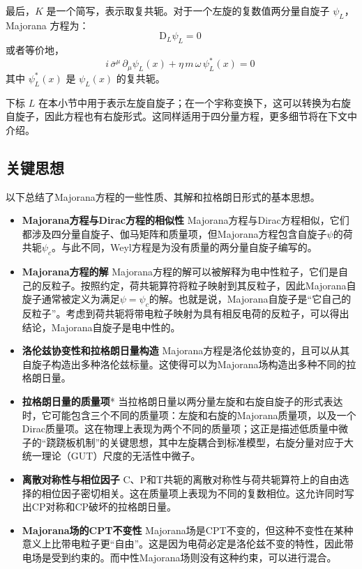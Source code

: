 最后，\( K \) 是一个简写，表示取复共轭。对于一个左旋的复数值两分量自旋子 \( \psi_L \)，Majorana 方程为：
\[
\mathrm{D}_{L} \psi_L = 0~
\]
或者等价地，
\[
i \, \overline{\sigma}^{\mu} \, \partial_{\mu} \psi_L(x) + \eta \, m \, \omega \, \psi_L^*(x) = 0~
\]
其中 \( \psi_L^*(x) \) 是 \( \psi_L(x) \) 的复共轭。  

下标 \(L\) 在本小节中用于表示左旋自旋子；在一个宇称变换下，这可以转换为右旋自旋子，因此方程也有右旋形式。这同样适用于四分量方程，更多细节将在下文中介绍。
\subsection{关键思想}

以下总结了Majorana方程的一些性质、其解和拉格朗日形式的基本思想。

\begin{itemize}
\item \textbf{Majorana方程与Dirac方程的相似性}  
   Majorana方程与Dirac方程相似，它们都涉及四分量自旋子、伽马矩阵和质量项，但Majorana方程包含自旋子\(\psi\)的荷共轭\(\psi_c\)。与此不同，Weyl方程是为没有质量的两分量自旋子编写的。
\item \textbf{Majorana方程的解}  
   Majorana方程的解可以被解释为电中性粒子，它们是自己的反粒子。按照约定，荷共轭算符将粒子映射到其反粒子，因此Majorana自旋子通常被定义为满足\(\psi = \psi_c\)的解。也就是说，Majorana自旋子是“它自己的反粒子”。考虑到荷共轭将带电粒子映射为具有相反电荷的反粒子，可以得出结论，Majorana自旋子是电中性的。
\item \textbf{洛伦兹协变性和拉格朗日量构造} 
   Majorana方程是洛伦兹协变的，且可以从其自旋子构造出多种洛伦兹标量。这使得可以为Majorana场构造出多种不同的拉格朗日量。
\item \textbf{拉格朗日量的质量项}* 
   当拉格朗日量以两分量左旋和右旋自旋子的形式表达时，它可能包含三个不同的质量项：左旋和右旋的Majorana质量项，以及一个Dirac质量项。这在物理上表现为两个不同的质量项；这正是描述低质量中微子的“跷跷板机制”的关键思想，其中左旋耦合到标准模型，右旋分量对应于大统一理论（GUT）尺度的无活性中微子。
\item \textbf{离散对称性与相位因子} 
   C、P和T共轭的离散对称性与荷共轭算符上的自由选择的相位因子密切相关。这在质量项上表现为不同的复数相位。这允许同时写出CP对称和CP破坏的拉格朗日量。
\item \textbf{Majorana场的CPT不变性}  
   Majorana场是CPT不变的，但这种不变性在某种意义上比带电粒子更“自由”。这是因为电荷必定是洛伦兹不变的特性，因此带电场是受到约束的。而中性Majorana场则没有这种约束，可以进行混合。
\end{itemize}
